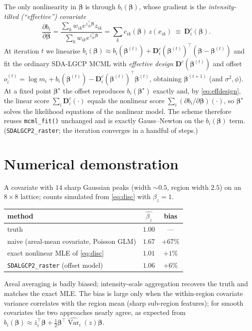 \documentclass[11pt]{article}
\newcommand{\D}{\mathbf{D}}
\newcommand{\bet}{\bm{\beta}}
\newcommand{\Var}{\operatorname{Var}}
\begin{document}
The only nonlinearity in $\bet$ is through $b_i(\bet)$, whose gradient is the
\emph{intensity-tilted (``effective'') covariate}
\begin{equation}
\frac{\partial b_i}{\partial \bet}
=\frac{\sum_k w_{ik}e^{z_{ik}^\top\bet}z_{ik}}{\sum_k w_{ik}e^{z_{ik}^\top\bet}}
=\sum_k c_{ik}(\bet)\,z(x_{ik})\ \equiv\ \D^c_i(\bet).
\label{eq:effdesign}
\end{equation}
At iteration $t$ we linearise $b_i(\bet)\approx b_i(\bet^{(t)})
+\D^c_i(\bet^{(t)})^\top(\bet-\bet^{(t)})$ and fit the ordinary SDA-LGCP MCML with
\emph{effective design} $\D^c(\bet^{(t)})$ and offset
$o_i^{(t)}=\log m_i+b_i(\bet^{(t)})-\D^c_i(\bet^{(t)})^\top\bet^{(t)}$, obtaining
$\bet^{(t+1)}$ (and $\sigma^2,\phi$). At a fixed point $\bet^\star$ the offset
reproduces $b_i(\bet^\star)$ exactly and, by \eqref{eq:effdesign}, the linear score
$\sum_i\D^c_i(\cdot)$ equals the nonlinear score $\sum_i(\partial b_i/\partial\bet)(\cdot)$,
so $\bet^\star$ solves the likelihood equations of the nonlinear model. The scheme
therefore reuses \texttt{mcml\_fit()} unchanged and is exactly Gauss--Newton on the
$b_i(\bet)$ term. (\texttt{SDALGCP2\_raster}; the iteration converges in a handful
of steps.)

\section{Numerical demonstration}

A covariate with $14$ sharp Gaussian peaks (width $\sim0.5$, region width $2.5$) on
an $8\times8$ lattice; counts simulated from \eqref{eq:disc} with $\beta_z=1$.

\begin{center}
\begin{tabular}{@{}lcc@{}}
\toprule
method & $\widehat{\beta_z}$ & bias \\
\midrule
truth & $1.00$ & --- \\
naive (areal-mean covariate, Poisson GLM) & $1.67$ & $+67\%$ \\
exact nonlinear MLE of \eqref{eq:disc} & $1.01$ & $+1\%$ \\
\texttt{SDALGCP2\_raster} (offset model) & $1.06$ & $+6\%$ \\
\bottomrule
\end{tabular}
\end{center}

Areal averaging is badly biased; intensity-scale aggregation recovers the truth and
matches the exact MLE. The bias is large only when the within-region covariate
variance correlates with the region mean (sharp sub-region features); for smooth
covariates the two approaches nearly agree, as expected from
$b_i(\bet)\approx\bar z_i^\top\bet+\tfrac12\bet^\top\widehat{\Var}_i(z)\bet$.
\end{document}
